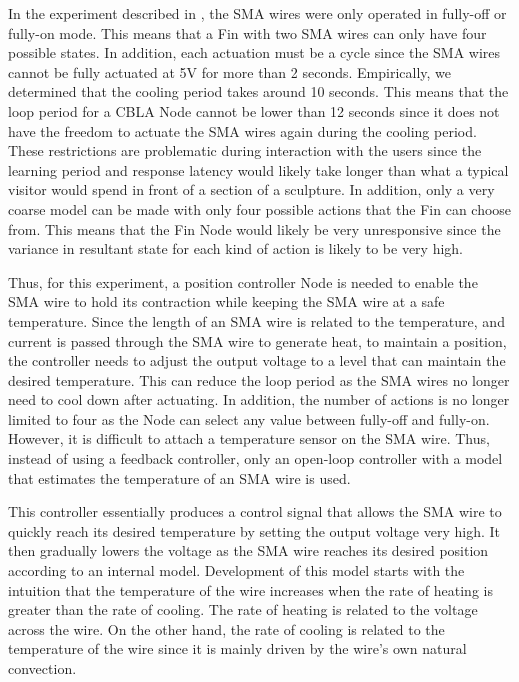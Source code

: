 In the experiment described in , the SMA wires were only operated in fully-off or fully-on mode. This means that a Fin with two SMA wires can only have four possible states. In addition, each actuation must be a cycle since the SMA wires cannot be fully actuated at 5V for more than 2 seconds. Empirically, we determined that the cooling period takes around 10 seconds. This means that the loop period for a CBLA Node cannot be lower than 12 seconds since it does not have the freedom to actuate the SMA wires again during the cooling period. These restrictions are problematic during interaction with the users since the learning period and response latency would likely take longer than what a typical visitor would spend in front of a section of a sculpture. In addition, only a very coarse model can be made with only four possible actions that the Fin can choose from. This means that the Fin Node would likely be very unresponsive since the variance in resultant state for each kind of action is likely to be very high.

Thus, for this experiment, a position controller Node is needed to enable the SMA wire to hold its contraction while keeping the SMA wire at a safe temperature. Since the length of an SMA wire is related to the temperature, and current is passed through the SMA wire to generate heat, to maintain a position, the controller needs to adjust the output voltage to a level that can maintain the desired temperature. This can reduce the loop period as the SMA wires no longer need to cool down after actuating. In addition, the number of actions is no longer limited to four as the Node can select any value between fully-off and fully-on. However, it is difficult to attach a temperature sensor on the SMA wire. Thus, instead of using a feedback controller, only an open-loop controller with a model that estimates the temperature of an SMA wire is used.

This controller essentially produces a control signal that allows the SMA wire to quickly reach its desired temperature by setting the output voltage very high. It then gradually lowers the voltage as the SMA wire reaches its desired position according to an internal model. Development of this model starts with the intuition that the temperature of the wire increases when the rate of heating is greater than the rate of cooling. The rate of heating is related to the voltage across the wire. On the other hand, the rate of cooling is related to the temperature of the wire since it is mainly driven by the wire's own natural convection. 

